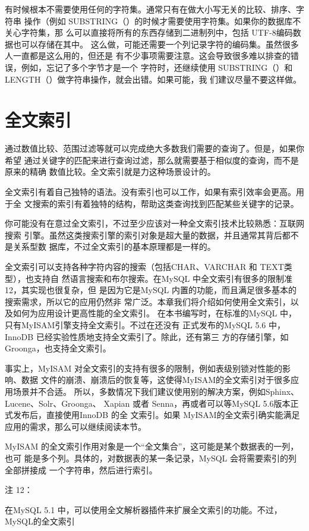 有时候根本不需要使用任何的字符集。通常只有在做大小写无关的比较、排序、字符串
操作（例如 SUBSTRING（）的时候才需要使用字符集。如果你的数据库不关心字符集，那
么可以直接将所有的东西存储到二进制列中，包括 UTF-8编码数据也可以存储在其中。
这么做，可能还需要一个列记录字符的编码集。虽然很多人一直都是这么用的，但还是
有不少事项需要注意。这会导致很多难以排查的错误，例如，忘记了多个字节才是一个
字符时，还继续使用 SUBSTRING（）和 LENGTH（）做字符串操作，就会出错。如果可能，我
们建议尽量不要这样做。

\section{全文索引}
通过数值比较、范围过滤等就可以完成绝大多数我们需要的查询了。但是，如果你希望
通过关键字的匹配来进行查询过滤，那么就需要基于相似度的查询，而不是原来的精确
数值比较。全文索引就是力这种场景设计的。

全文索引有着自己独特的语法。没有索引也可以工作，如果有索引效率会更高。用于全
文搜索的索引有着独特的结构，帮助这类查询找到匹配某些关键字的记录。

你可能没有在意过全文索引，不过至少应该对一种全文索引技术比较熟悉：互联网搜索
引擎。虽然这类搜索引擎的索引对象是超大量的数据，并且通常其背后都不是关系型数
据库，不过全文索引的基本原理都是一样的。

全文索引可以支持各种字符内容的搜索（包括CHAR、VARCHAR 和 TEXT类型），也支持自
然语言搜索和布尔搜索。在MySQL 中全文索引有很多的限制准12，其实现也很复杂，但
是因为它是MySQL 内置的功能，而且满足很多基本的搜索需求，所以它的应用仍然非
常广泛。本章我们将介绍如何使用全文索引，以及如何为应用设计更高性能的全文索引。
在本书编写时，在标准的MySQL 中，只有MyISAM引擎支持全文索引。不过在还没有
正式发布的MySQL 5.6 中，InnoDB 已经实验性质地支持全文索引了。除此，还有第三
方的存储引擎，如Groonga，也支持全文索引。

事实上，MyISAM 对全文索引的支持有很多的限制，例如表级别锁对性能的影响、数据
文件的崩溃、崩溃后的恢复等，这使得MyISAM的全文索引对于很多应用场景并不合适。
所以，多数情况下我们建议使用别的解决方案，例如Sphinx、Lucene、Solr、Groonga、
Xapian 或者 Senna，再或者可以等MySQL 5.6版本正式发布后，直接使用InnoDB 的全
文索引。如果 MyISAM的全文索引确实能满足应用的需求，那么可以继续阅读本节。

MyISAM 的全文索引作用对象是一个“全文集合”，这可能是某个数据表的一列，也可
能是多个列。具体的，对数据表的某一条记录，MySQL 会将需要索引的列全部拼接成
一个字符串，然后进行索引。

注 12：

在MySQL 5.1 中，可以使用全文解析器插件来扩展全文索引的功能。不过，MySQL的全文索引

